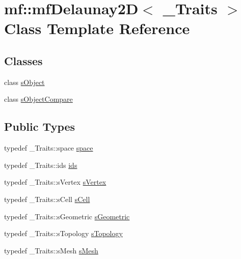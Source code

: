 \hypertarget{classmf_1_1mfDelaunay2D}{
\section{mf::mfDelaunay2D$<$ \_\-Traits $>$ Class Template Reference}
\label{classmf_1_1mfDelaunay2D}
}
\subsection*{Classes}
\begin{DoxyCompactItemize}
\item 
class \hyperlink{classmf_1_1mfDelaunay2D_1_1sObject}{sObject}
\item 
class \hyperlink{classmf_1_1mfDelaunay2D_1_1sObjectCompare}{sObjectCompare}
\end{DoxyCompactItemize}
\subsection*{Public Types}
\begin{DoxyCompactItemize}
\item 
typedef \_\-Traits::space \hyperlink{classmf_1_1mfDelaunay2D_a97a4b30074ea2f5c4e27605f72155671}{space}
\item 
typedef \_\-Traits::ids \hyperlink{classmf_1_1mfDelaunay2D_af821015a498654435308272878e686f2}{ids}
\item 
typedef \_\-Traits::sVertex \hyperlink{classmf_1_1mfDelaunay2D_a6459b2d8aa82aedabc7be094a80fac5f}{sVertex}
\item 
typedef \_\-Traits::sCell \hyperlink{classmf_1_1mfDelaunay2D_ad78e8b9a85b29e1a284d1e613107cb81}{sCell}
\item 
typedef \_\-Traits::sGeometric \hyperlink{classmf_1_1mfDelaunay2D_a4e309eb0d3c22a7e6ec87e6e85d2e837}{sGeometric}
\item 
typedef \_\-Traits::sTopology \hyperlink{classmf_1_1mfDelaunay2D_a604ecb4a3620ae79b0e041073cf1383d}{sTopology}
\item 
typedef \_\-Traits::sMesh \hyperlink{classmf_1_1mfDelaunay2D_ad1c5c239afa497e1c8edef8f1046a58a}{sMesh}
\end{DoxyCompactItemize}
